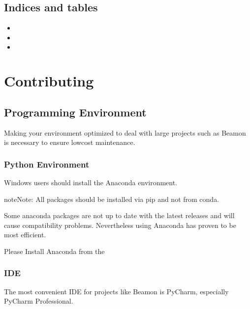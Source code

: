 \documentclass[letterpaper,10pt,english]{sphinxmanual}
\begin{document}
\subsection{Indices and tables}
\label{\detokenize{api:indices-and-tables}}\begin{itemize}
\item {} 

\item {} 

\item {} 

\end{itemize}


\section{Contributing}
\label{\detokenize{contrib:contributing}}\label{\detokenize{contrib::doc}}

\subsection{Programming Environment}
\label{\detokenize{env:programming-environment}}\label{\detokenize{env::doc}}
Making your environment optimized to deal with large projects such as Beamon is necessary to ensure low\sphinxhyphen{}cost
maintenance.


\subsubsection{Python Environment}
\label{\detokenize{env:python-environment}}
Windows users should install the Anaconda environment.

\begin{sphinxadmonition}{note}{Note:}
All packages should be installed via pip and not from conda.
\end{sphinxadmonition}

Some anaconda packages are not up to date with the latest releases and will cause compatibility problems.
Nevertheless using Anaconda has proven to be most efficient.

Please Install Anaconda from the 


\subsubsection{IDE}
\label{\detokenize{env:ide}}
The most convenient IDE for projects like Beamon is PyCharm, especially PyCharm Professional.
\end{document}
